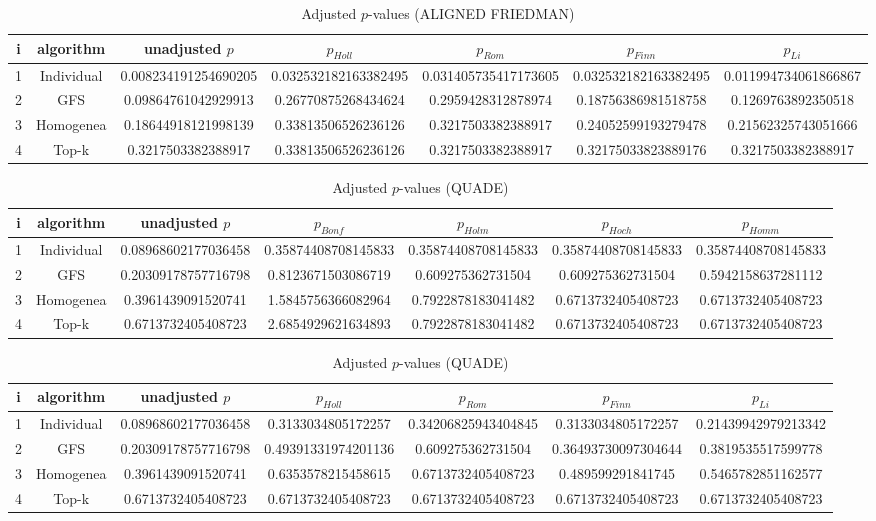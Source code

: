 \documentclass[a4paper,10pt]{article}
\begin{document}
\begin{landscape}
\begin{table}[!htp]
\centering\scriptsize
\caption{Adjusted $p$-values (ALIGNED FRIEDMAN)}
\begin{tabular}{ccccccc}
i&algorithm&unadjusted $p$&$p_{Holl}$&$p_{Rom}$&$p_{Finn}$&$p_{Li}$\\
\hline
1&Individual&0.008234191254690205&0.032532182163382495&0.031405735417173605&0.032532182163382495&0.011994734061866867\\
2&GFS&0.09864761042929913&0.26770875268434624&0.2959428312878974&0.18756386981518758&0.1269763892350518\\
3&Homogenea&0.18644918121998139&0.33813506526236126&0.3217503382388917&0.24052599193279478&0.21562325743051666\\
4&Top-k&0.3217503382388917&0.33813506526236126&0.3217503382388917&0.32175033823889176&0.3217503382388917\\
\hline
\end{tabular}
\end{table}


\newpage

\begin{table}[!htp]
\centering\scriptsize
\caption{Adjusted $p$-values (QUADE)}
\begin{tabular}{ccccccc}
i&algorithm&unadjusted $p$&$p_{Bonf}$&$p_{Holm}$&$p_{Hoch}$&$p_{Homm}$\\
\hline
1&Individual&0.08968602177036458&0.35874408708145833&0.35874408708145833&0.35874408708145833&0.35874408708145833\\
2&GFS&0.20309178757716798&0.8123671503086719&0.609275362731504&0.609275362731504&0.5942158637281112\\
3&Homogenea&0.3961439091520741&1.5845756366082964&0.7922878183041482&0.6713732405408723&0.6713732405408723\\
4&Top-k&0.6713732405408723&2.6854929621634893&0.7922878183041482&0.6713732405408723&0.6713732405408723\\
\hline
\end{tabular}
\end{table}

\begin{table}[!htp]
\centering\scriptsize
\caption{Adjusted $p$-values (QUADE)}
\begin{tabular}{ccccccc}
i&algorithm&unadjusted $p$&$p_{Holl}$&$p_{Rom}$&$p_{Finn}$&$p_{Li}$\\
\hline
1&Individual&0.08968602177036458&0.3133034805172257&0.34206825943404845&0.3133034805172257&0.21439942979213342\\
2&GFS&0.20309178757716798&0.49391331974201136&0.609275362731504&0.36493730097304644&0.3819535517599778\\
3&Homogenea&0.3961439091520741&0.6353578215458615&0.6713732405408723&0.489599291841745&0.5465782851162577\\
4&Top-k&0.6713732405408723&0.6713732405408723&0.6713732405408723&0.6713732405408723&0.6713732405408723\\
\hline
\end{tabular}
\end{table}

\end{landscape}
\end{document}
